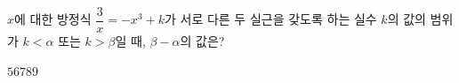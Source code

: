 $x$에 대한 방정식 $\dfrac{3}{x}=-x^3+k$가 서로 다른 두 실근을 갖도록 하는 실수 $k$의 값의 범위가 $k<\alpha$ 또는 $k>\beta$일 때, $\beta-\alpha$의 값은?
\begin{choices32}{$5$}{$6$}{$7$}{$8$}{$9$}\end{choices32}
